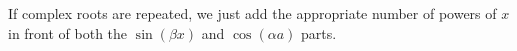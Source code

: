 \noindent
If complex roots are repeated, we just add the appropriate number of powers of $x$ in front of both the $\sin{(\beta x)}$ and $\cos{(\alpha a)}$ parts.
\pagebreak %

\ifodd{}\fi